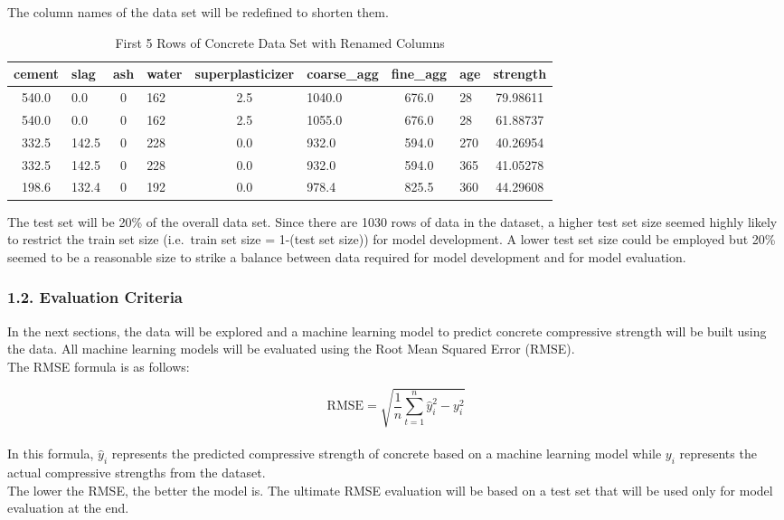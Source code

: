 \documentclass[
]{article}
\begin{document}
The column names of the data set will be redefined to shorten them.

\begin{table}[H]

\caption{\label{tab:Rename column names}First 5 Rows of Concrete Data Set with Renamed Columns}
\centering
\fontsize{11}{13}\selectfont
\begin{tabular}[t]{|>{}c|||>{}l|||>{}c|||>{}l|||>{}c|||>{}l|||>{}c|||>{}l|||>{}c|}
\hline
cement & slag & ash & water & superplasticizer & coarse\_agg & fine\_agg & age & strength\\
\hline
540.0 & 0.0 & 0 & 162 & 2.5 & 1040.0 & 676.0 & 28 & 79.98611\\
\hline
540.0 & 0.0 & 0 & 162 & 2.5 & 1055.0 & 676.0 & 28 & 61.88737\\
\hline
332.5 & 142.5 & 0 & 228 & 0.0 & 932.0 & 594.0 & 270 & 40.26954\\
\hline
332.5 & 142.5 & 0 & 228 & 0.0 & 932.0 & 594.0 & 365 & 41.05278\\
\hline
198.6 & 132.4 & 0 & 192 & 0.0 & 978.4 & 825.5 & 360 & 44.29608\\
\hline
\end{tabular}
\end{table}

The test set will be 20\% of the overall data set. Since there are 1030
rows of data in the dataset, a higher test set size seemed highly likely
to restrict the train set size (i.e.~train set size = 1-(test set size))
for model development. A lower test set size could be employed but 20\%
seemed to be a reasonable size to strike a balance between data required
for model development and for model evaluation.

\hypertarget{evaluation-criteria}{%
\subsubsection{1.2. Evaluation Criteria}\label{evaluation-criteria}}

In the next sections, the data will be explored and a machine learning
model to predict concrete compressive strength will be built using the
data. All machine learning models will be evaluated using the Root Mean
Squared Error (RMSE).\\

The RMSE formula is as follows:

\[\mbox{RMSE} = \sqrt{\frac{1}{n}\sum_{t=1}^{n}\hat{y}_i^2-y_i^2}\]\\
In this formula, \(\hat{y}_i\) represents the predicted compressive
strength of concrete based on a machine learning model while \(y_i\)
represents the actual compressive strengths from the dataset.\\
The lower the RMSE, the better the model is. The ultimate RMSE
evaluation will be based on a test set that will be used only for model
evaluation at the end.\\
\end{document}
